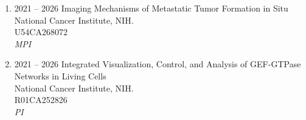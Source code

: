 \begin{enumerate}
\item 2021 -- 2026 
\hspace{8pt}
Imaging Mechanisms of Metastatic Tumor Formation in Situ \\
National Cancer Institute, NIH. \\
U54CA268072 \\ 
{\it MPI}

\item 2021 -- 2026 
\hspace{8pt}
Integrated Visualization, Control, and Analysis of GEF-GTPase Networks in Living Cells \\
National Cancer Institute, NIH. \\
R01CA252826 \\ 
{\it PI}

\end{enumerate}

